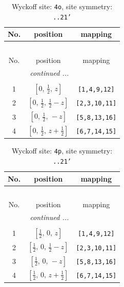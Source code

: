 \documentclass[fleqn,8pt]{jsarticle}
\begin{document}
\renewcommand{\arraystretch}{1.2}
\begin{longtable}{ccc}
\caption{Wyckoff site: {\tt 4o}, site symmetry: {\tt ..21'}}
 \\
 \hline \hline
No. & position & mapping \\ \hline \endfirsthead

\multicolumn{2}{l}{\tablename\ \thetable{}} \\
 \hline \hline
No. & position & mapping \\ \hline \endhead

 \hline \hline
\multicolumn{2}{r}{\footnotesize\it continued ...} \\ \endfoot

 \hline \hline
\multicolumn{2}{r}{} \\ \endlastfoot

1 & $\left[ 0,\, \frac{1}{2},\, z \right]$ & {\tt [1,4,9,12]} \\ \hline
2 & $\left[ 0,\, \frac{1}{2},\, \frac{1}{2} - z \right]$ & {\tt [2,3,10,11]} \\ \hline
3 & $\left[ 0,\, \frac{1}{2},\, - z \right]$ & {\tt [5,8,13,16]} \\ \hline
4 & $\left[ 0,\, \frac{1}{2},\, z + \frac{1}{2} \right]$ & {\tt [6,7,14,15]} \\
\end{longtable}
\renewcommand{\arraystretch}{1.2}
\begin{longtable}{ccc}
\caption{Wyckoff site: {\tt 4p}, site symmetry: {\tt ..21'}}
 \\
 \hline \hline
No. & position & mapping \\ \hline \endfirsthead

\multicolumn{2}{l}{\tablename\ \thetable{}} \\
 \hline \hline
No. & position & mapping \\ \hline \endhead

 \hline \hline
\multicolumn{2}{r}{\footnotesize\it continued ...} \\ \endfoot

 \hline \hline
\multicolumn{2}{r}{} \\ \endlastfoot

1 & $\left[ \frac{1}{2},\, 0,\, z \right]$ & {\tt [1,4,9,12]} \\ \hline
2 & $\left[ \frac{1}{2},\, 0,\, \frac{1}{2} - z \right]$ & {\tt [2,3,10,11]} \\ \hline
3 & $\left[ \frac{1}{2},\, 0,\, - z \right]$ & {\tt [5,8,13,16]} \\ \hline
4 & $\left[ \frac{1}{2},\, 0,\, z + \frac{1}{2} \right]$ & {\tt [6,7,14,15]} \\
\end{longtable}
\end{document}
